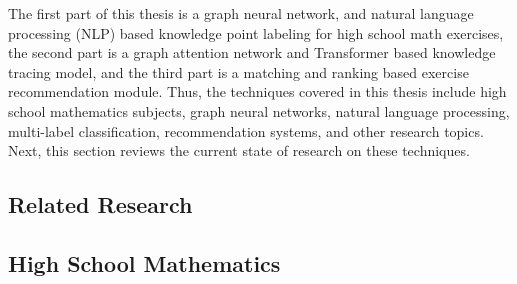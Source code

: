 The first part of this thesis is a graph neural network, and natural language processing (NLP) based knowledge point labeling for high school math exercises, the second part is a graph attention network and Transformer based knowledge tracing model, and the third part is a matching and ranking based exercise recommendation module. Thus, the techniques covered in this thesis include high school mathematics subjects, graph neural networks, natural language processing, multi-label classification, recommendation systems, and other research topics. Next, this section reviews the current state of research on these techniques.

\subsection{Related Research}

\subsection{High School Mathematics}


